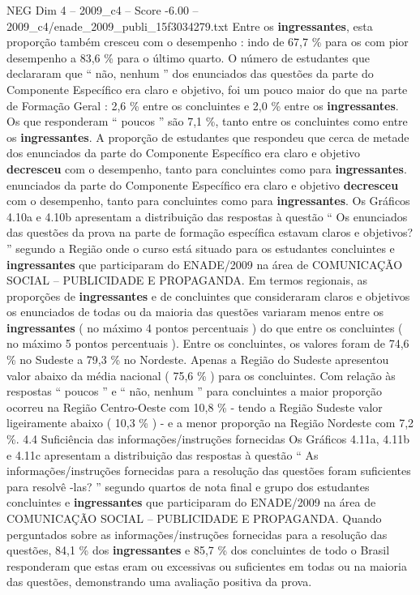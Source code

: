 \begin{textsample}{NEG Dim 4 – 2009\_c4 – Score -6.00 – 2009\_c4/enade\_2009\_publi\_15f3034279.txt}
Entre os \textbf{ingressantes}, esta proporção também cresceu com o desempenho : indo de 67,7 \% para os com pior desempenho a 83,6 \% para o último quarto.
O número de estudantes que declararam que “ não, nenhum ” dos enunciados das questões da parte do Componente Específico era claro e objetivo, foi um pouco maior do que na parte de Formação Geral : 2,6 \% entre os concluintes e 2,0 \% entre os \textbf{ingressantes}.
Os que responderam “ poucos ” são 7,1 \%, tanto entre os concluintes como entre os \textbf{ingressantes}.
A proporção de estudantes que respondeu que cerca de metade dos enunciados da parte do Componente Específico era claro e objetivo \textbf{decresceu} com o desempenho, tanto para concluintes como para \textbf{ingressantes}. enunciados da parte do Componente Específico era claro e objetivo \textbf{decresceu} com o desempenho, tanto para concluintes como para \textbf{ingressantes}.
Os Gráficos 4.10a e 4.10b apresentam a distribuição das respostas à questão “ Os enunciados das questões da prova na parte de formação específica estavam claros e objetivos? ” segundo a Região onde o curso está situado para os estudantes concluintes e \textbf{ingressantes} que participaram do ENADE/2009 na área de COMUNICAÇÃO SOCIAL – PUBLICIDADE E PROPAGANDA.
Em termos regionais, as proporções de \textbf{ingressantes} e de concluintes que consideraram claros e objetivos os enunciados de todas ou da maioria das questões variaram menos entre os \textbf{ingressantes} ( no máximo 4 pontos percentuais ) do que entre os concluintes ( no máximo 5 pontos percentuais ).
Entre os concluintes, os valores foram de 74,6 \% no Sudeste a 79,3 \% no Nordeste.
Apenas a Região do Sudeste apresentou valor abaixo da média nacional ( 75,6 \% ) para os concluintes.
Com relação às respostas “ poucos ” e “ não, nenhum ” para concluintes a maior proporção ocorreu na Região Centro-Oeste com 10,8 \% - tendo a Região Sudeste valor ligeiramente abaixo ( 10,3 \% ) - e a menor proporção na Região Nordeste com 7,2 \%. 4.4 Suficiência das informações/instruções fornecidas Os Gráficos 4.11a, 4.11b e 4.11c apresentam a distribuição das respostas à questão “ As informações/instruções fornecidas para a resolução das questões foram suficientes para resolvê -las? ” segundo quartos de nota final e grupo dos estudantes concluintes e \textbf{ingressantes} que participaram do ENADE/2009 na área de COMUNICAÇÃO SOCIAL – PUBLICIDADE E PROPAGANDA.
Quando perguntados sobre as informações/instruções fornecidas para a resolução das questões, 84,1 \% dos \textbf{ingressantes} e 85,7 \% dos concluintes de todo o Brasil responderam que estas eram ou excessivas ou suficientes em todas ou na maioria das questões, demonstrando uma avaliação positiva da prova.

\end{textsample}
